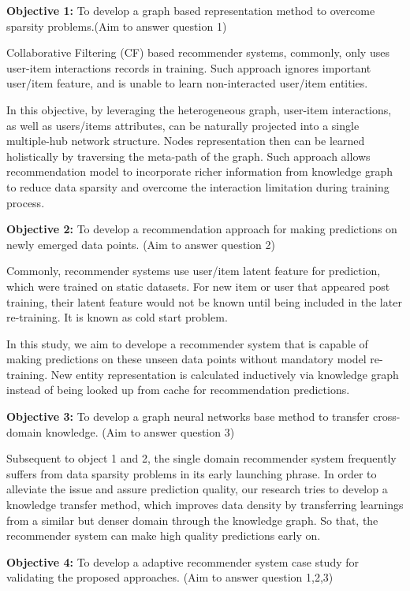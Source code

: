 \bigskip
\textbf{Objective 1:} To develop a graph based representation method to overcome sparsity problems.(Aim to answer question 1)

Collaborative Filtering (CF) based recommender systems, commonly, only uses user-item interactions records in training. Such approach ignores important user/item feature, and is unable to learn non-interacted user/item entities. 

In this objective, by leveraging the heterogeneous graph, user-item interactions, as well as users/items attributes, can be naturally projected into a single multiple-hub network \citep{Shi2017} structure. Nodes representation then can be learned holistically by traversing the meta-path of the graph. Such approach allows recommendation model to incorporate richer information from knowledge graph to reduce data sparsity and overcome the interaction limitation during training process.


\bigskip
\textbf{Objective 2:} To develop a recommendation approach for making predictions on newly emerged data points. (Aim to answer question 2)

Commonly, recommender systems use user/item latent feature for prediction, which were trained on static datasets. For new item or user that appeared post training, their latent feature would not be known until being included in the later re-training. It is known as cold start problem.

In this study, we aim to develope a recommender system that is capable of making predictions on these unseen data points without mandatory model re-training. New entity representation is calculated inductively via knowledge graph instead of being looked up from cache for recommendation predictions.


\bigskip
\textbf{Objective 3:} To develop a graph neural networks base method to transfer cross-domain knowledge. (Aim to answer question 3)

Subsequent to object 1 and 2, the single domain recommender system frequently suffers from data sparsity problems in its early launching phrase. In order to alleviate the issue and assure prediction quality, our research tries to develop a knowledge transfer method, which improves data density by transferring learnings from a similar but denser domain through the knowledge graph. So that, the recommender system can make high quality predictions early on.

\bigskip
\textbf{Objective 4:} To develop a adaptive recommender system case study for validating the proposed approaches. (Aim to answer question 1,2,3)


